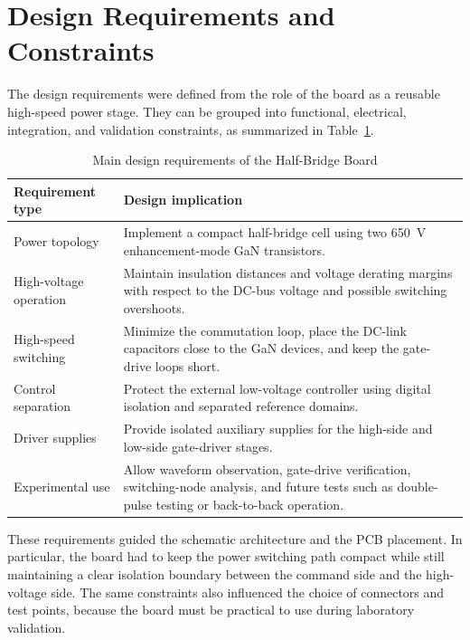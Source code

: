 \section{Design Requirements and Constraints}

The design requirements were defined from the role of the board as a reusable
high-speed power stage. They can be grouped into functional, electrical,
integration, and validation constraints, as summarized in
Table~\ref{tab:half_bridge_design_requirements}.

\begin{table}[H]
\centering
\caption{Main design requirements of the Half-Bridge Board}
\label{tab:half_bridge_design_requirements}
\begin{tabularx}{\textwidth}{|>{\raggedright\arraybackslash}p{4.0cm}|X|}
\hline
\textbf{Requirement type} & \textbf{Design implication} \\ \hline
Power topology &
Implement a compact half-bridge cell using two 650~V enhancement-mode GaN
transistors. \\ \hline
High-voltage operation &
Maintain insulation distances and voltage derating margins with respect to the
DC-bus voltage and possible switching overshoots. \\ \hline
High-speed switching &
Minimize the commutation loop, place the DC-link capacitors close to the GaN
devices, and keep the gate-drive loops short. \\ \hline
Control separation &
Protect the external low-voltage controller using digital isolation and
separated reference domains. \\ \hline
Driver supplies &
Provide isolated auxiliary supplies for the high-side and low-side gate-driver
stages. \\ \hline
Experimental use &
Allow waveform observation, gate-drive verification, switching-node analysis,
and future tests such as double-pulse testing or back-to-back operation. \\
\hline
\end{tabularx}
\end{table}

These requirements guided the schematic architecture and the PCB placement. In
particular, the board had to keep the power switching path compact while still
maintaining a clear isolation boundary between the command side and the
high-voltage side. The same constraints also influenced the choice of connectors
and test points, because the board must be practical to use during laboratory
validation.



